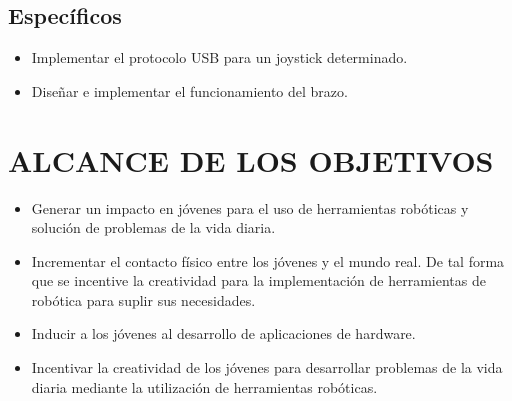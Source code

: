 \documentclass[10pt,graphicx,caption,rotating]{article}
\begin{document}
\subsection{Específicos}
\begin{itemize}
\item Implementar el protocolo USB para un joystick determinado.
\item Diseñar e implementar el funcionamiento del brazo.
\end{itemize}

\section{ALCANCE DE LOS OBJETIVOS}
\noindent
\begin{itemize}
 \item Generar un impacto en jóvenes para el uso de herramientas robóticas y solución de problemas de la vida diaria.
 \item Incrementar el contacto físico entre los jóvenes y el mundo real. De tal forma que se incentive la creatividad para la implementación de herramientas de robótica para suplir sus necesidades.
 \item Inducir a los jóvenes al desarrollo de aplicaciones de hardware.
 \item Incentivar la creatividad de los jóvenes para desarrollar problemas de la vida diaria mediante la utilización de herramientas robóticas.
\end{itemize}
\end{document}
